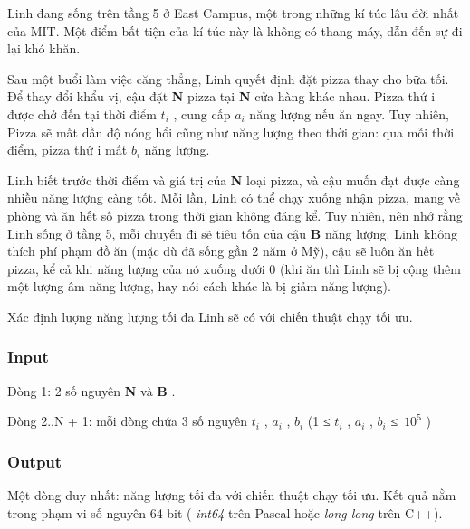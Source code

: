 





    Linh đang sống trên tầng 5 ở East Campus, một trong những kí túc lâu đời nhất của MIT. Một điểm bất tiện của kí túc này là không có thang máy, dẫn đến sự đi lại khó khăn.   



   Sau một buổi làm việc căng thẳng, Linh quyết định đặt pizza thay cho bữa tối. Để thay đổi khẩu vị, cậu đặt   \textbf{    N   }   pizza tại   \textbf{    N   }   cửa hàng khác nhau. Pizza thứ i được chở đến tại thời điểm   \textbf{    $t_{i}$}   , cung cấp   \textbf{    $a_{i}$}   năng lượng nếu ăn ngay. Tuy nhiên, Pizza sẽ mất dần độ nóng hổi cũng như năng lượng theo thời gian: qua mỗi thời điểm, pizza thứ i mất   \textbf{    $b_{i}$}   năng lượng.  

     Linh biết trước thời điểm và giá trị của     \textbf{      N     }     loại pizza, và cậu muốn đạt được càng nhiều năng lượng càng tốt. Mỗi lần, Linh có thể chạy xuống nhận pizza, mang về phòng và ăn hết số pizza trong thời gian không đáng kể. Tuy nhiên, nên nhớ rằng Linh sống ở tầng 5, mỗi chuyến đi sẽ tiêu tốn của cậu     \textbf{      B     }     năng lượng. Linh không thích phí phạm đồ ăn (mặc dù đã sống gần 2 năm ở Mỹ), cậu sẽ luôn ăn hết pizza, kể cả khi năng lượng của nó xuống dưới 0 (khi ăn thì Linh sẽ bị cộng thêm một lượng âm năng lượng, hay nói cách khác là bị giảm năng lượng).    

      Xác định lượng năng lượng tối đa Linh sẽ có với chiến thuật chạy tối ưu.     

\subsubsection{   Input  }

   Dòng 1: 2 số nguyên   \textbf{    N   }   và   \textbf{    B   }   .  

   Dòng 2..N + 1: mỗi dòng chứa 3 số nguyên   \textbf{    $t_{i}$}   ,   \textbf{    $a_{i}$}   ,   \textbf{    $b_{i}$}   (1 ≤   \textbf{    $t_{i}$}   ,   \textbf{    $a_{i}$}   ,   \textbf{    $b_{i}$}   ≤ $10^{5}$   )  

\subsubsection{   Output  }

   Một dòng duy nhất: năng lượng tối đa với chiến thuật chạy tối ưu. Kết quả nằm trong phạm vi số nguyên 64-bit (   \emph{    int64   }   trên Pascal hoặc   \emph{    long long   }   trên C++).  

